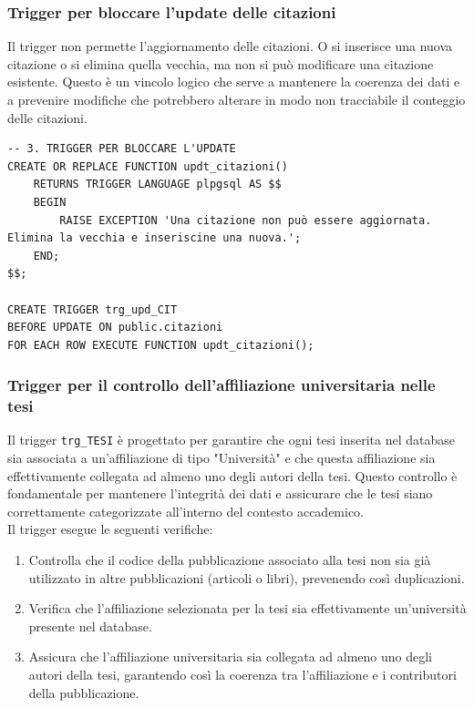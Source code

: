 \documentclass[a4paper,12pt]{article}
\begin{document}
\subsubsection{Trigger per bloccare l'update delle citazioni}
Il trigger non permette l'aggiornamento delle citazioni. O si inserisce una nuova citazione o si elimina quella vecchia, ma non si può modificare una citazione esistente. Questo è un vincolo logico che serve a mantenere la coerenza dei dati e a prevenire modifiche che potrebbero alterare in modo non tracciabile il conteggio delle citazioni.
\begin{lstlisting}
-- 3. TRIGGER PER BLOCCARE L'UPDATE
CREATE OR REPLACE FUNCTION updt_citazioni()
    RETURNS TRIGGER LANGUAGE plpgsql AS $$
    BEGIN
        RAISE EXCEPTION 'Una citazione non può essere aggiornata. Elimina la vecchia e inseriscine una nuova.';
    END;
$$;

CREATE TRIGGER trg_upd_CIT
BEFORE UPDATE ON public.citazioni
FOR EACH ROW EXECUTE FUNCTION updt_citazioni();
\end{lstlisting}
\subsubsection{Trigger per il controllo dell'affiliazione universitaria nelle tesi}
Il trigger \texttt{trg\_TESI} è progettato per garantire che ogni tesi inserita nel database sia associata a un'affiliazione di tipo "Università" e che questa affiliazione sia effettivamente collegata ad almeno uno degli autori della tesi. Questo controllo è fondamentale per mantenere l'integrità dei dati e assicurare che le tesi siano correttamente categorizzate all'interno del contesto accademico.\\
Il trigger esegue le seguenti verifiche:
\begin{enumerate}[label=\textbf{\arabic*}), leftmargin=1.5cm]
    \item Controlla che il codice della pubblicazione associato alla tesi non sia già utilizzato in altre pubblicazioni (articoli o libri), prevenendo così duplicazioni.
    \item Verifica che l'affiliazione selezionata per la tesi sia effettivamente un'università presente nel database.
    \item Assicura che l'affiliazione universitaria sia collegata ad almeno uno degli autori della tesi, garantendo così la coerenza tra l'affiliazione e i contributori della pubblicazione.
\end{enumerate}
\end{document}
